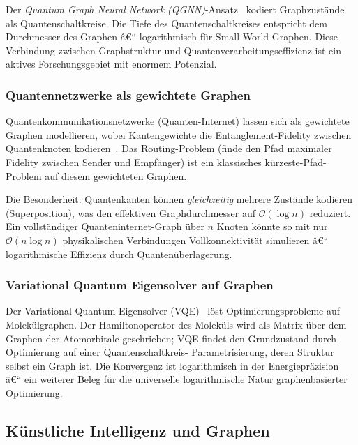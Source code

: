 ﻿\documentclass[12pt,a4paper,twoside]{article}
\theoremstyle{definition}
\theoremstyle{plain}
\theoremstyle{remark}
\begin{document}
Der \emph{Quantum Graph Neural Network (QGNN)}-Ansatz~\cite{Verdon2019}
kodiert Graphzustände als Quantenschaltkreise.  Die
Tiefe des Quantenschaltkreises entspricht dem Durchmesser
des Graphen â€“ logarithmisch für Small-World-Graphen.
Diese Verbindung zwischen Graphstruktur und Quantenverarbeitungseffizienz
ist ein aktives Forschungsgebiet mit enormem Potenzial.

\subsubsection{Quantennetzwerke als gewichtete Graphen}

Quantenkommunikationsnetzwerke (Quanten-Internet) lassen sich
als gewichtete Graphen modellieren, wobei Kantengewichte die
Entanglement-Fidelity zwischen Quantenknoten kodieren~\cite{Kimble2008}.
Das Routing-Problem (finde den Pfad maximaler Fidelity zwischen
Sender und Empfänger) ist ein klassisches kürzeste-Pfad-Problem
auf diesem gewichteten Graphen.

Die Besonderheit: Quantenkanten können \emph{gleichzeitig}
mehrere Zustände kodieren (Superposition), was den effektiven
Graphdurchmesser auf $\mathcal{O}(\log n)$ reduziert.
Ein vollständiger Quanteninternet-Graph über $n$ Knoten könnte
so mit nur $\mathcal{O}(n \log n)$ physikalischen Verbindungen
Vollkonnektivität simulieren â€“ logarithmische Effizienz durch
Quantenüberlagerung.

\subsubsection{Variational Quantum Eigensolver auf Graphen}

Der Variational Quantum Eigensolver (VQE)~\cite{Peruzzo2014}
löst Optimierungsprobleme auf Molekülgraphen.  Der
Hamiltonoperator des Moleküls wird als Matrix über dem
Graphen der Atomorbitale geschrieben; VQE findet den
Grundzustand durch Optimierung auf einer Quantenschaltkreis-
Parametrisierung, deren Struktur selbst ein Graph ist.
Die Konvergenz ist logarithmisch in der Energiepräzision â€“
ein weiterer Beleg für die universelle logarithmische Natur
graphenbasierter Optimierung.

\subsection{Künstliche Intelligenz und Graphen}
\label{sub:ki}
\end{document}
